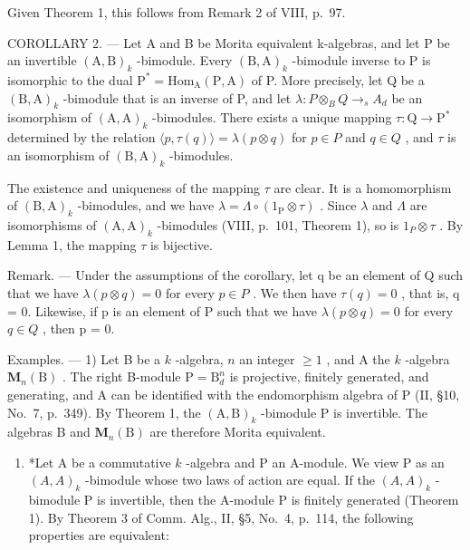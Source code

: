 Given Theorem 1, this follows from Remark 2 of VIII, p.~97.

COROLLARY 2. --- Let A and B be Morita equivalent k-algebras, and let P be an invertible \((\mathrm{A},\mathrm{B})_{k}\) -bimodule. Every \((\mathrm{B},\mathrm{A})_{k}\) -bimodule inverse to P is isomorphic to the dual \(\mathrm{P}^{*}=\mathrm{Hom}_{\mathrm{A}}(\mathrm{P},\mathrm{A})\) of P. More precisely, let Q be a \((\mathrm{B},\mathrm{A})_{k}\) -bimodule that is an inverse of P, and let \(\lambda:P\otimes_{B}Q\to_{s}A_{d}\) be an isomorphism of \((\mathrm{A},\mathrm{A})_{k}\) -bimodules. There exists a unique mapping \(\tau:\mathrm{Q}\to\mathrm{P}^{*}\) determined by the relation \(\langle p,\tau(q)\rangle=\lambda(p\otimes q)\) for \(p\in P\) and \(q\in Q\) , and \(\tau\) is an isomorphism of \((\mathrm{B},\mathrm{A})_{k}\) -bimodules.

The existence and uniqueness of the mapping \(\tau\) are clear. It is a homomorphism of \((\mathrm{B},\mathrm{A})_{k}\) -bimodules, and we have \(\lambda=\Lambda\circ(1_{\mathrm{P}}\otimes\tau)\) . Since \(\lambda\) and \(\Lambda\) are isomorphisms of \((\mathrm{A},\mathrm{A})_{k}\) -bimodules (VIII, p.~101, Theorem 1), so is \(1_{P}\otimes\tau\) . By Lemma 1, the mapping \(\tau\) is bijective.

Remark. --- Under the assumptions of the corollary, let q be an element of Q such that we have \(\lambda(p \otimes q) = 0\) for every \(p \in P\) . We then have \(\tau(q) = 0\) , that is, q = 0. Likewise, if p is an element of P such that we have \(\lambda(p \otimes q) = 0\) for every \(q \in Q\) , then p = 0.

Examples. --- 1) Let B be a \(k\) -algebra, \(n\) an integer \(\geqslant 1\) , and A the \(k\) -algebra \(\mathbf{M}_n(\mathrm{B})\) . The right B-module \(\mathrm{P} = \mathrm{B}_d^n\) is projective, finitely generated, and generating, and A can be identified with the endomorphism algebra of P (II, §10, No.~7, p.~349). By Theorem 1, the \((\mathrm{A},\mathrm{B})_k\) -bimodule P is invertible. The algebras B and \(\mathbf{M}_n(\mathrm{B})\) are therefore Morita equivalent.

\begin{enumerate}
\def\labelenumi{\arabic{enumi})}
\setcounter{enumi}{1}
\tightlist
\item
  *Let A be a commutative \(k\) -algebra and P an A-module. We view P as an \((A, A)_k\) -bimodule whose two laws of action are equal. If the \((A, A)_k\) -bimodule P is invertible, then the A-module P is finitely generated (Theorem 1). By Theorem 3 of Comm. Alg., II, §5, No.~4, p.~114, the following properties are equivalent:
\end{enumerate}

